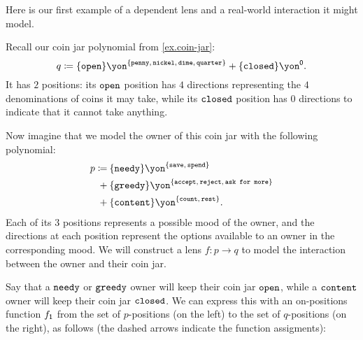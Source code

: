 \documentclass[Book-Poly]{subfiles}
\begin{document}
Here is our first example of a dependent lens and a real-world interaction it might model.

\begin{example}
  Recall our coin jar polynomial from \cref{ex.coin-jar}:
  \[
    q\coloneqq\{\const{open}\}\yon^{\{\const{penny},\,\const{nickel},\,\const{dime},\,\const{quarter}\}}+\{\const{closed}\}\yon^\0.
  \]
  It has $2$ positions: its $\texttt{open}$ position has $4$ directions representing the $4$ denominations of coins it may take, while its $\texttt{closed}$ position has $0$ directions to indicate that it cannot take anything.


  Now imagine that we model the owner of this coin jar with the following polynomial:
  \begin{align*}
    p\coloneqq\:
    &\{\const{needy}\}\yon^{\{\const{save},\, \const{spend}\}}
      \\
    +\:
    &\{\const{greedy}\}\yon^{\{\const{accept},\, \const{reject},\,\const{ask for more}\}}
      \\
    +\:
    &\{\const{content}\}\yon^{\{\const{count},\,\const{rest}\}}.
  \end{align*}
  Each of its $3$ positions represents a possible mood of the owner, and the directions at each position represent the options available to an owner in the corresponding mood.
  We will construct a lens $f\colon p\to q$ to model the interaction between the owner and their coin jar.

  Say that a $\texttt{needy}$ or $\texttt{greedy}$ owner will keep their coin jar $\texttt{open}$, while a $\texttt{content}$ owner will keep their coin jar $\texttt{closed}$.
  We can express this with an on-positions function $f_{\textsf{1}}$ from the set of $p$-positions (on the left) to the set of $q$-positions (on the right), as follows (the dashed arrows indicate the function assigments):
  \begin{center}
\end{center}
\end{example}
\end{document}
